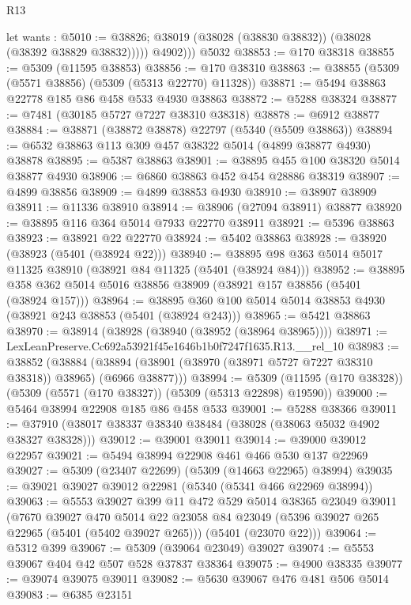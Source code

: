 \begin{lexlean}{R13}
\begin{coremodule}
            let wants : @5010 := @38826;
            @38019 (@38028 (@38830 @38832)) (@38028 (@38392 @38829 @38832)))))
          @4902)))
    @5032
@38853 := @170 @38318
@38855 := @5309 (@11595 @38853)
@38856 := @170 @38310
@38863 := @38855 (@5309 (@5571 @38856) (@5309 (@5313 @22770) @11328))
@38871 := @5494 @38863 @22778 @185 @86 @458 @533 @4930 @38863
@38872 := @5288 @38324
@38877 := @7481 (@30185 @5727 @7227 @38310 @38318)
@38878 := @6912 @38877
@38884 := @38871 (@38872 @38878) @22797 (@5340 (@5509 @38863))
@38894 := @6532 @38863 @113 @309 @457 @38322 @5014 (@4899 @38877 @4930) @38878
@38895 := @5387 @38863
@38901 := @38895 @455 @100 @38320 @5014 @38877 @4930
@38906 := @6860 @38863 @452 @454 @28886 @38319
@38907 := @4899 @38856
@38909 := @4899 @38853 @4930
@38910 := @38907 @38909
@38911 := @11336 @38910
@38914 := @38906 (@27094 @38911) @38877
@38920 := @38895 @116 @364 @5014 @7933 @22770 @38911
@38921 := @5396 @38863
@38923 := @38921 @22 @22770
@38924 := @5402 @38863
@38928 := @38920 (@38923 (@5401 (@38924 @22)))
@38940 := @38895 @98 @363 @5014 @5017 @11325 @38910 (@38921 @84 @11325 (@5401 (@38924 @84)))
@38952 := @38895 @358 @362 @5014 @5016 @38856 @38909 (@38921 @157 @38856 (@5401 (@38924 @157)))
@38964 := @38895 @360 @100 @5014 @5014 @38853 @4930 (@38921 @243 @38853 (@5401 (@38924 @243)))
@38965 := @5421 @38863
@38970 := @38914 (@38928 (@38940 (@38952 (@38964 @38965))))
@38971 := LexLeanPreserve.Cc692a53921f45e1646b1b0f7247f1635.R13.__rel_10
@38983 := @38852
    (@38884 (@38894 (@38901 (@38970 (@38971 @5727 @7227 @38310 @38318)) @38965) (@6966 @38877)))
@38994 := @5309 (@11595 (@170 @38328)) (@5309 (@5571 (@170 @38327)) (@5309 (@5313 @22898) @19590))
@39000 := @5464 @38994 @22908 @185 @86 @458 @533
@39001 := @5288 @38366
@39011 := @37910 (@38017 @38337 @38340 @38484 (@38028 (@38063 @5032 @4902 @38327 @38328)))
@39012 := @39001 @39011
@39014 := @39000 @39012 @22957
@39021 := @5494 @38994 @22908 @461 @466 @530 @137 @22969
@39027 := @5309 (@23407 @22699) (@5309 (@14663 @22965) @38994)
@39035 := @39021 @39027 @39012 @22981 (@5340 (@5341 @466 @22969 @38994))
@39063 := @5553
    @39027
    @399
    @11
    @472
    @529
    @5014
    @38365
    @23049
    @39011
    (@7670
      @39027
      @470
      @5014
      @22
      @23058
      @84
      @23049
      (@5396 @39027 @265 @22965 (@5401 (@5402 @39027 @265)))
      (@5401 (@23070 @22)))
@39064 := @5312 @399
@39067 := @5309 (@39064 @23049) @39027
@39074 := @5553 @39067 @404 @42 @507 @528 @37837 @38364
@39075 := @4900 @38335
@39077 := @39074 @39075 @39011
@39082 := @5630 @39067 @476 @481 @506 @5014
@39083 := @6385 @23151

\end{coremodule}
\end{lexlean}
